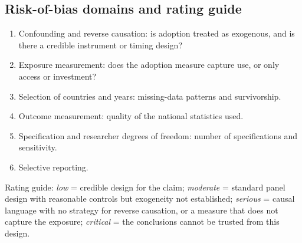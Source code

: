 \subsection*{Risk-of-bias domains and rating guide}
\begin{enumerate}[leftmargin=1.6em,itemsep=1pt]\small
\item Confounding and reverse causation: is adoption treated as exogenous, and is there a credible instrument or timing design?
\item Exposure measurement: does the adoption measure capture use, or only access or investment?
\item Selection of countries and years: missing-data patterns and survivorship.
\item Outcome measurement: quality of the national statistics used.
\item Specification and researcher degrees of freedom: number of specifications and sensitivity.
\item Selective reporting.
\end{enumerate}
Rating guide: \emph{low} = credible design for the claim; \emph{moderate} = standard panel design with reasonable controls but exogeneity not established; \emph{serious} = causal language with no strategy for reverse causation, or a measure that does not capture the exposure; \emph{critical} = the conclusions cannot be trusted from this design.
